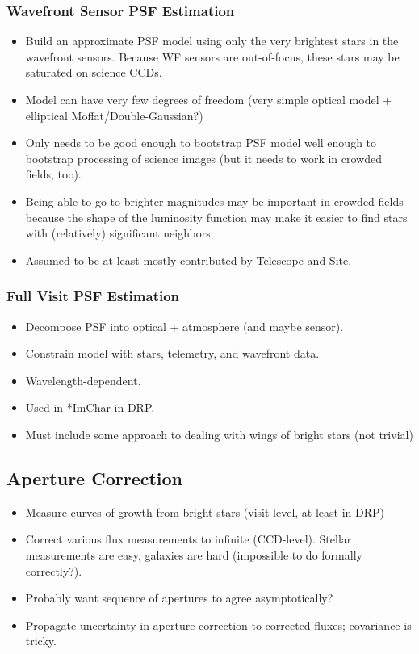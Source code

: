 \subsubsection{Wavefront Sensor PSF Estimation}
\label{sec:acWavefrontSensorPSF}
\begin{itemize}
\item Build an approximate PSF model using only the very brightest stars in the wavefront sensors.  Because WF sensors are out-of-focus, these stars may be saturated on science CCDs.
\item Model can have very few degrees of freedom (very simple optical model + elliptical Moffat/Double-Gaussian?)
\item Only needs to be good enough to bootstrap PSF model well enough to bootstrap processing of science images (but it needs to work in crowded fields, too).
\item Being able to go to brighter magnitudes may be important in crowded fields because the shape of the luminosity function may make it easier to find stars with (relatively) significant neighbors.
\item Assumed to be at least mostly contributed by Telescope and Site.
\end{itemize}

\subsubsection{Full Visit PSF Estimation}
\label{sec:acFullVisitPSF}
\begin{itemize}
\item Decompose PSF into optical + atmosphere (and maybe sensor).
\item Constrain model with stars, telemetry, and wavefront data.
\item Wavelength-dependent.
\item Used in *ImChar in DRP.
\item Must include some approach to dealing with wings of bright stars (not trivial)
\end{itemize}

\subsection{Aperture Correction}
\label{sec:acApCorr}
\begin{itemize}
\item Measure curves of growth from bright stars (visit-level, at least in DRP)
\item Correct various flux measurements to infinite (CCD-level).  Stellar measurements are easy, galaxies are hard (impossible to do formally correctly?).
\item Probably want sequence of apertures to agree asymptotically?
\item Propagate uncertainty in aperture correction to corrected fluxes; covariance is tricky.
\end{itemize}

